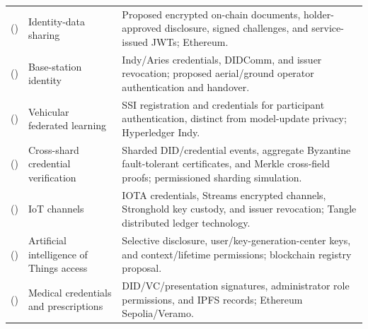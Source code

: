 \begin{longtable}{@{}>{\raggedright\arraybackslash}m{}>{\raggedright\arraybackslash}m{}>{\raggedright\arraybackslash}m{}@{}}
\addlinespace[5pt]
\cite{updateAgarkar2024BADIMAC} (\citeyear{updateAgarkar2024BADIMAC}) & Identity-data sharing & Proposed encrypted on-chain documents, holder-approved disclosure, signed challenges, and service-issued JWTs; Ethereum. \\
\addlinespace[5pt]
\cite{updateZeydan2024ABSIdentity} (\citeyear{updateZeydan2024ABSIdentity}) & Base-station identity & Indy/Aries credentials, DIDComm, and issuer revocation; proposed aerial/ground operator authentication and handover. \\
\addlinespace[5pt]
\cite{updateZeydan2024SSI} (\citeyear{updateZeydan2024SSI}) & Vehicular federated learning & SSI registration and credentials for participant authentication, distinct from model-update privacy; Hyperledger Indy. \\
\addlinespace[5pt]
\cite{updateLiu2024SSDID} (\citeyear{updateLiu2024SSDID}) & Cross-shard credential verification & Sharded DID/credential events, aggregate Byzantine fault-tolerant certificates, and Merkle cross-field proofs; permissioned sharding simulation. \\
\addlinespace[5pt]
\cite{updateRamirez2025IOTAIdentity} (\citeyear{updateRamirez2025IOTAIdentity}) & IoT channels & IOTA credentials, Streams encrypted channels, Stronghold key custody, and issuer revocation; Tangle distributed ledger technology. \\
\addlinespace[5pt]
\cite{updateRen2025AIoTIdentity} (\citeyear{updateRen2025AIoTIdentity}) & Artificial intelligence of Things access & Selective disclosure, user/key-generation-center keys, and context/lifetime permissions; blockchain registry proposal. \\
\addlinespace[5pt]
\cite{updateSeidi2025HealthcareSSI} (\citeyear{updateSeidi2025HealthcareSSI}) & Medical credentials and prescriptions & DID/VC/presentation signatures, administrator role permissions, and IPFS records; Ethereum Sepolia/Veramo. \\
\end{longtable}
\endgroup
